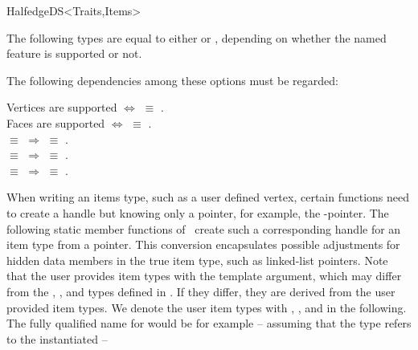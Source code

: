 \begin{ccRefConcept}{HalfedgeDS<Traits,Items>}
\begin{ccAdvanced}


The following types are equal to either  or
, depending on whether the named feature is
supported or not.

\ccGlue
{}
\ccGlue
{}
\ccGlue
{}
\ccGlue
{}
\ccGlue
{}

The following dependencies among these options must be regarded:

Vertices are supported $\Longleftrightarrow$
 $\equiv$ .
\\
Faces are supported $\Longleftrightarrow$
 $\equiv$ .
\\
 $\equiv$  $\Longrightarrow$
 $\equiv$ .
\\
 $\equiv$  $\Longrightarrow$
 $\equiv$ .
\\
 $\equiv$  $\Longrightarrow$
 $\equiv$ .


\end{ccAdvanced}

\begin{ccAdvanced}

When writing an items type, such as a user defined vertex, certain
functions need to create a handle but knowing only a pointer, for
example, the -pointer. The following static member functions
of \ccRefName\ create such a corresponding handle for an item type
from a pointer. This conversion encapsulates possible adjustments for
hidden data members in the true item type, such as linked-list
pointers. Note that the user provides item types with the
 template argument, which may differ from the ,
, and  types defined in \ccRefName. If they 
differ, they are derived from the user provided item types. We denote the
user item types with , , and
 in the following. The fully qualified name for 
 would be for example -- assuming that the type 
refers to the instantiated  --


\end{ccAdvanced}
\end{ccRefConcept}
